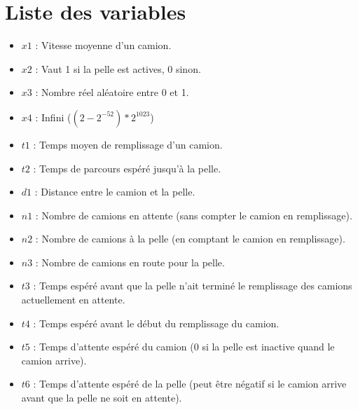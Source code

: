 \documentclass[letterpaper,12pt]{article}
\begin{document}
	
	
	
	

	\section{Liste des variables}
	\label{sec:vars}
	
	
	\begin{itemize}
		\setlength\itemsep{0.01em}
		\item $x1$ : Vitesse moyenne d'un camion.
		\item $x2$ : Vaut 1 si la pelle est actives, 0 sinon.
		\item $x3$ : Nombre réel aléatoire entre 0 et 1.
		\item $x4$ : Infini ($(2-2^{-52})*2^{1023}$)
		\item $t1$ : Temps moyen de remplissage d'un camion.
		\item $t2$ : Temps de parcours espéré jusqu'à la pelle.  
		\item $d1$ : Distance entre le camion et la pelle.
		\item $n1$ : Nombre de camions en attente (sans compter le camion en remplissage).
		\item $n2$ : Nombre de camions à la pelle (en comptant le camion en remplissage).
		\item $n3$ : Nombre de camions en route pour la pelle.
		\item $t3$ : Temps espéré avant que la pelle n'ait terminé le remplissage des camions actuellement en attente.
		\item $t4$ : Temps espéré avant le début du remplissage du camion.
		\item $t5$ : Temps d'attente espéré du camion (0 si la pelle est inactive quand le camion arrive).
		\item $t6$ : Temps d'attente espéré de la pelle (peut être négatif si le camion arrive avant que la pelle ne soit en attente).
	\end{itemize}
	
	
	
\end{document}
